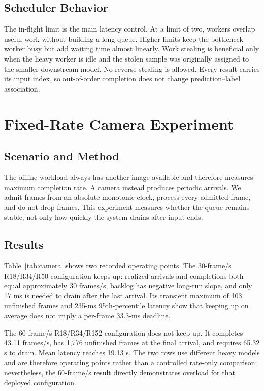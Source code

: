 \subsection{Scheduler Behavior}

The in-flight limit is the main latency control.  At a limit of two, workers
overlap useful work without building a long queue.  Higher limits keep the
bottleneck worker busy but add waiting time almost linearly.  Work stealing is
beneficial only when the heavy worker is idle and the stolen sample was
originally assigned to the smaller downstream model.  No reverse stealing is
allowed.  Every result carries its input index, so out-of-order completion does
not change prediction--label association.

\section{Fixed-Rate Camera Experiment}
\label{sec:camera}

\subsection{Scenario and Method}

The offline workload always has another image available and therefore measures
maximum completion rate.  A camera instead produces periodic arrivals.  We
admit frames from an absolute monotonic clock, process every admitted frame,
and do not drop frames.  This experiment measures whether the queue remains
stable, not only how quickly the system drains after input ends.

\subsection{Results}

Table~\ref{tab:camera} shows two recorded operating points.  The 30-frame/s
R18/R34/R50 configuration keeps up: realized arrivals and completions both
equal approximately 30 frames/s, backlog has negative long-run slope, and only
17 ms is needed to drain after the last arrival.  Its transient maximum of 103
unfinished frames and 235-ms 95th-percentile latency show that keeping up on
average does not imply a per-frame 33.3-ms deadline.

The 60-frame/s R18/R34/R152 configuration does not keep up.  It completes 43.11
frames/s, has 1,776 unfinished frames at the final arrival, and requires 65.32
s to drain.  Mean latency reaches 19.13 s.  The two rows use different heavy
models and are therefore operating points rather than a controlled rate-only
comparison; nevertheless, the 60-frame/s result directly demonstrates
overload for that deployed configuration.

